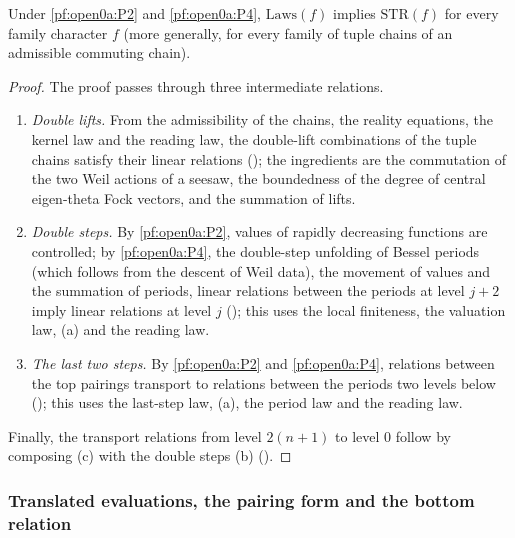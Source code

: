 \begin{proposition}\label{pf:open0a:str}
Under \ref{pf:open0a:P2} and \ref{pf:open0a:P4}, $\mathrm{Laws}(f)$ implies $\mathrm{STR}(f)$ for every family character
$f$ (more generally, for every family of tuple chains of an admissible commuting chain).
\end{proposition}

\begin{proof}
The proof passes through three intermediate relations.
\begin{enumerate}[label=(\alph*)]
\item \emph{Double lifts.} From the admissibility of the chains, the reality equations, the kernel law and the reading law,
the double-lift combinations of the tuple chains satisfy their linear relations
(); the ingredients are the commutation of the two Weil
actions of a seesaw, the boundedness of the degree of central eigen-theta Fock vectors, and the summation of lifts.
\item \emph{Double steps.} By \ref{pf:open0a:P2}, values of rapidly decreasing functions are controlled; by
\ref{pf:open0a:P4}, the double-step unfolding of Bessel periods (which follows from the descent of Weil data), the
movement of values and the summation of periods, linear relations between the periods at level $j+2$ imply linear
relations at level $j$ (); this uses the local
finiteness, the valuation law, (a) and the reading law.
\item \emph{The last two steps.} By \ref{pf:open0a:P2} and \ref{pf:open0a:P4}, relations between the top pairings transport
to relations between the periods two levels below ();
this uses the last-step law, (a), the period law and the reading law.
\end{enumerate}
Finally, the transport relations from level $2(n+1)$ to level $0$ follow by composing (c) with the double steps (b)
().
\end{proof}

\subsubsection{Translated evaluations, the pairing form and the bottom relation}


